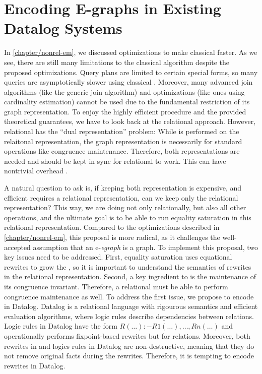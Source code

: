 \chapter{Encoding E-graphs in Existing Datalog Systems}

In \autoref{chapter/nonrel-em},
 we discussed optimizations to make classical \ematching faster. 
As we see, there are still many limitations to the classical \ematching algorithm
 despite the proposed optimizations.
Query plans are limited to certain special forms,
 so many queries are asymptotically slower using classical \ematching.
Moreover,
 many advanced join algorithms (like the generic join algorithm) 
 and optimizations (like ones using cardinality estimation) cannot be used
 due to the fundamental restriction of its graph representation.
To enjoy the highly efficient \ematching procedure and the provided theoretical guarantees,
 we have to look back at the relational \ematching approach.
However,
 relational \ematching has the ``dual representation'' problem:
While \ematching is performed on the relaitonal representation,
 the graph representation is necessarily for standard \egraph operations
 like congruence maintenance.
Therefore,
 both representations are needed and should be kept in sync
 for relational \ematching to work.
This can have nontrivial overhead \citep{relational-ematching}.

A natural question to ask is, 
 if keeping both representation is expensive, 
 and efficient \ematching requires a relational representation,
 can we keep only the relational representation?
This way, 
 we are doing not only \ematching relationally,
 but also all other \egraph operations,
 and the ultimate goal is to be able to run equality saturation
 in this relational representation.
Compared to the optimizations described in \autoref{chapter/nonrel-em},
 this proposal is more radical,
 as it challenges the well-accepted assumption that an e-\textit{egraph} is a graph.
To implement this proposal, two key issues need to be addressed.
First,
 equality saturation uses equational rewrites to grow the \egraph,
 so it is important to understand the semantics of rewrites 
 in the relational representation.
Second,
 a key ingredient to \egraphs is the maintenance of its congruence invariant.
Therefore,
 a relational \egraph must be able to perform congruence maintenance as well.
To address the first issue, 
 we propose to encode \egraphs in Datalog.
Datalog is a relational language with rigourous semantics and efficient evaluation algorithms,
 where logic rules describe dependencies between relations.
Logic rules in Datalog have the form $R(\ldots) :- R1(\ldots),\ldots,Rn(\ldots)$ and
 operationally performs fixpoint-based rewrites but for relations.
Moreover, both rewrites in \egraphs and logics rules in Datalog are non-destructive,
 meaning that they do not remove original facts during the rewrites.
Therefore,
 it is tempting to encode \egraph rewrites in Datalog.

